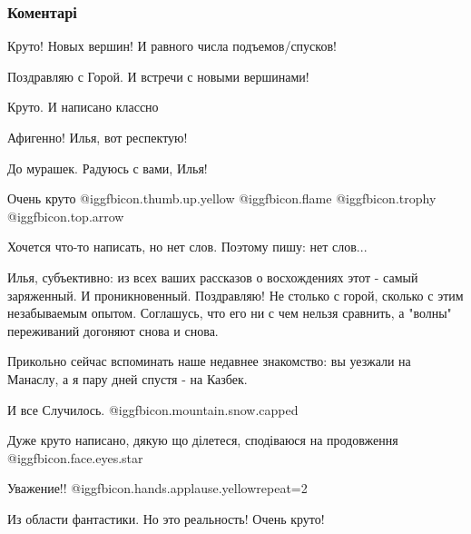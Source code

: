  
 
 
 
 
\subsubsection{Коментарі}
\label{sec:05_10_2021.fb.kenigshtein_ilja.1.shturm_manaslu.cmt}

\begin{itemize} %
Круто! Новых вершин! И равного числа подъемов/спусков!

Поздравляю с Горой. И встречи с новыми вершинами!

Круто. И написано классно


Афигенно! Илья, вот респектую!

До мурашек. Радуюсь с вами, Илья!

Очень круто  @igg{fbicon.thumb.up.yellow}   @igg{fbicon.flame}  @igg{fbicon.trophy}  @igg{fbicon.top.arrow} 

Хочется что-то написать, но нет слов. Поэтому пишу: нет слов...


Илья, субъективно: из всех ваших рассказов о восхождениях этот - самый
заряженный. И проникновенный. Поздравляю! Не столько с горой, сколько с этим
незабываемым опытом. Соглашусь, что его ни с чем нельзя сравнить, а "волны"
переживаний догоняют снова и снова.

Прикольно сейчас вспоминать наше недавнее знакомство: вы уезжали на Манаслу, а
я пару дней спустя - на Казбек.

И все Случилось.  @igg{fbicon.mountain.snow.capped} ️

Дуже круто написано, дякую що ділетеся, сподіваюся на продовження @igg{fbicon.face.eyes.star} 

Уважение!!  @igg{fbicon.hands.applause.yellow}{repeat=2} 

Из области фантастики. Но это реальность! Очень круто!


\end{itemize}
